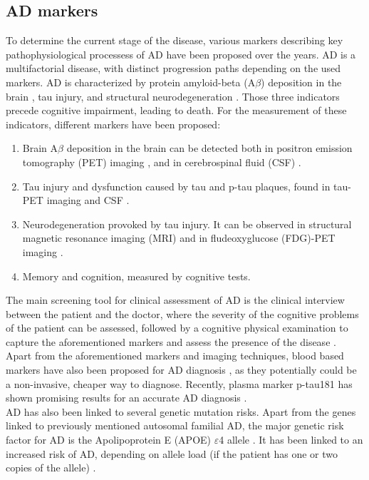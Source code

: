 \subsection{AD markers}

To determine the current stage of the disease, various markers describing key pathophysiological processess of AD have been proposed over the years. AD is a multifactorial disease, with distinct progression paths depending on the used markers. AD is characterized by protein amyloid-beta (A$\beta$) deposition in the brain \cite{Rissman2012}, tau injury, and structural neurodegeneration \cite{Jack2013}. Those three indicators precede cognitive impairment, leading to death. For the measurement of these indicators, different markers have been proposed:

\begin{enumerate}\itemsep5pt
\item Brain A$\beta$ deposition in the brain can be detected both in positron emission tomography (PET) imaging \cite{Clark2011}, and in cerebrospinal fluid (CSF) \cite{Andreasen1999}.
\item Tau injury and dysfunction caused by tau and p-tau plaques, found in tau-PET imaging and CSF \cite{Andreasen1999,Blennow2010}.
\item Neurodegeneration provoked by tau injury. It can be observed in structural magnetic resonance imaging (MRI) \cite{Weiner2005} and in fludeoxyglucose (FDG)-PET imaging \cite{Chetelat2003}.
\item Memory and cognition, measured by cognitive tests.
\end{enumerate}

The main screening tool for clinical assessment of AD is the clinical interview between the patient and the doctor, where the severity of the cognitive problems of the patient can be assessed, followed by a cognitive physical examination to capture the aforementioned markers and assess the presence of the disease \cite{Lane2018}. \\

Apart from the aforementioned markers and imaging techniques, blood based markers have also been proposed for AD diagnosis \cite{Shi2018}, as they potentially could be a non-invasive, cheaper way to diagnose. Recently, plasma marker p-tau181 has shown promising results for an accurate AD diagnosis \cite{Karikari2020}. \\

AD has also been linked to several genetic mutation risks. Apart from the genes linked to previously mentioned autosomal familial AD, the major genetic risk factor for AD is the Apolipoprotein E (APOE) $\varepsilon$4 allele \cite{Saunders1993}. It has been linked to an increased risk of AD, depending on allele load (if the patient has one or two copies of the allele) \cite{Liu2013a}.

